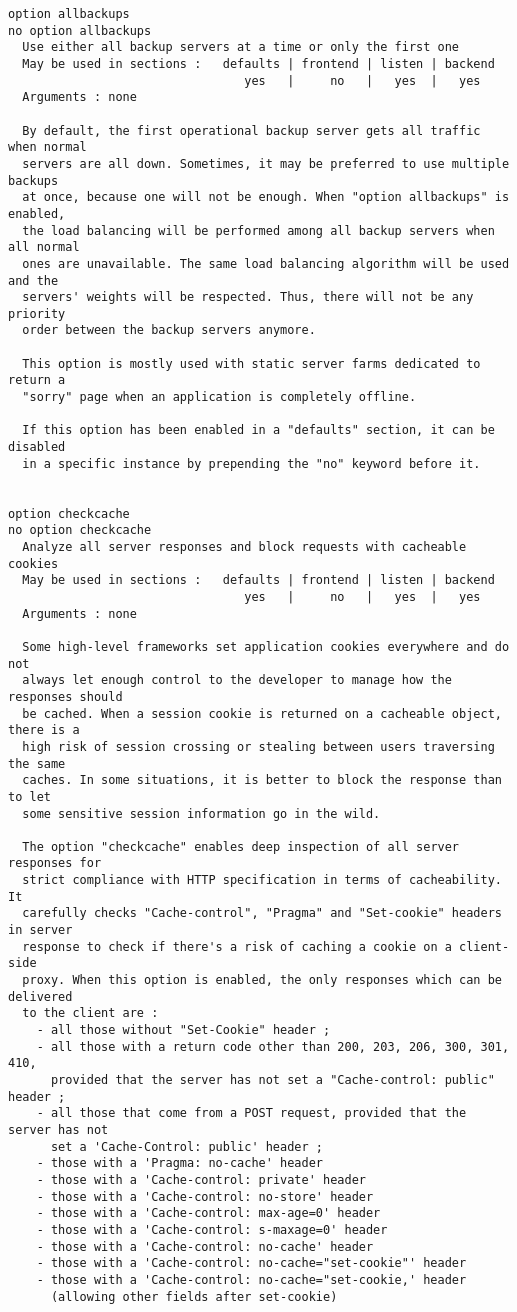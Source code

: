 \begin{verbatim}
option allbackups
no option allbackups
  Use either all backup servers at a time or only the first one
  May be used in sections :   defaults | frontend | listen | backend
                                 yes   |     no   |   yes  |   yes
  Arguments : none

  By default, the first operational backup server gets all traffic when normal
  servers are all down. Sometimes, it may be preferred to use multiple backups
  at once, because one will not be enough. When "option allbackups" is enabled,
  the load balancing will be performed among all backup servers when all normal
  ones are unavailable. The same load balancing algorithm will be used and the
  servers' weights will be respected. Thus, there will not be any priority
  order between the backup servers anymore.

  This option is mostly used with static server farms dedicated to return a
  "sorry" page when an application is completely offline.

  If this option has been enabled in a "defaults" section, it can be disabled
  in a specific instance by prepending the "no" keyword before it.


option checkcache
no option checkcache
  Analyze all server responses and block requests with cacheable cookies
  May be used in sections :   defaults | frontend | listen | backend
                                 yes   |     no   |   yes  |   yes
  Arguments : none

  Some high-level frameworks set application cookies everywhere and do not
  always let enough control to the developer to manage how the responses should
  be cached. When a session cookie is returned on a cacheable object, there is a
  high risk of session crossing or stealing between users traversing the same
  caches. In some situations, it is better to block the response than to let
  some sensitive session information go in the wild.

  The option "checkcache" enables deep inspection of all server responses for
  strict compliance with HTTP specification in terms of cacheability. It
  carefully checks "Cache-control", "Pragma" and "Set-cookie" headers in server
  response to check if there's a risk of caching a cookie on a client-side
  proxy. When this option is enabled, the only responses which can be delivered
  to the client are :
    - all those without "Set-Cookie" header ;
    - all those with a return code other than 200, 203, 206, 300, 301, 410,
      provided that the server has not set a "Cache-control: public" header ;
    - all those that come from a POST request, provided that the server has not
      set a 'Cache-Control: public' header ;
    - those with a 'Pragma: no-cache' header
    - those with a 'Cache-control: private' header
    - those with a 'Cache-control: no-store' header
    - those with a 'Cache-control: max-age=0' header
    - those with a 'Cache-control: s-maxage=0' header
    - those with a 'Cache-control: no-cache' header
    - those with a 'Cache-control: no-cache="set-cookie"' header
    - those with a 'Cache-control: no-cache="set-cookie,' header
      (allowing other fields after set-cookie)


\end{verbatim}
